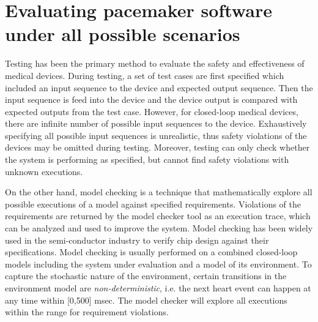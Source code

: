 \section{Evaluating pacemaker software under all possible scenarios}
Testing has been the primary method to evaluate the safety and effectiveness of medical devices. During testing, a set of test cases are first specified which included an input sequence to the device and expected output sequence. Then the input sequence is feed into the device and the device output is compared with expected outputs from the test case. However, for closed-loop medical devices, there are infinite number of possible input sequences to the device. Exhaustively specifying all possible input sequences is unrealistic, thus safety violations of the devices may be omitted during testing.
Moreover, testing can only check whether the system is performing as specified, but cannot find safety violations with unknown executions.

On the other hand, model checking is a technique that mathematically explore all possible executions of a model against specified requirements. Violations of the requirements are returned by the model checker tool as an execution trace, which can be analyzed and used to improve the system. Model checking has been widely used in the semi-conductor industry to verify chip design against their specifications.
Model checking is usually performed on a combined closed-loop models including the system under evaluation and a model of its environment. To capture the stochastic nature of the environment, certain transitions in the environment model are \emph{non-deterministic}, i.e. the next heart event can happen at any time within [0,500] msec. The model checker will explore all executions within the range for requirement violations.

